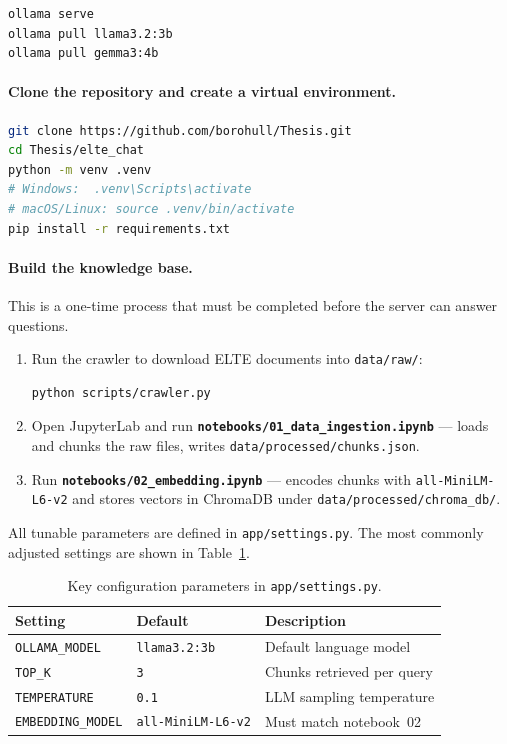 \begin{lstlisting}[language=bash]
ollama serve
ollama pull llama3.2:3b
ollama pull gemma3:4b
\end{lstlisting}

\paragraph{Clone the repository and create a virtual environment.}

\begin{lstlisting}[language=bash]
git clone https://github.com/borohull/Thesis.git
cd Thesis/elte_chat
python -m venv .venv
# Windows:  .venv\Scripts\activate
# macOS/Linux: source .venv/bin/activate
pip install -r requirements.txt
\end{lstlisting}

\paragraph{Build the knowledge base.}
This is a one-time process that must be completed before the server can answer questions.

\begin{enumerate}
    \item Run the crawler to download ELTE documents into \texttt{data/raw/}:
\begin{lstlisting}[language=bash]
python scripts/crawler.py
\end{lstlisting}
    \item Open JupyterLab and run \textbf{\texttt{notebooks/01\_data\_ingestion.ipynb}} — loads and chunks the raw files, writes \texttt{data/processed/chunks.json}.
    \item Run \textbf{\texttt{notebooks/02\_embedding.ipynb}} — encodes chunks with \texttt{all-MiniLM-L6-v2} and stores vectors in ChromaDB under \texttt{data/processed/chroma\_db/}.
\end{enumerate}

All tunable parameters are defined in \texttt{app/settings.py}. The most commonly adjusted settings are shown in Table~\ref{tab:settings}.

\begin{table}[H]
    \centering
    \begin{tabular}{ | m{} | m{} | m{} | }
        \hline
        \textbf{Setting} & \textbf{Default} & \textbf{Description} \\
        \hline \hline
        \texttt{OLLAMA\_MODEL} & \texttt{llama3.2:3b} & Default language model \\
        \hline
        \texttt{TOP\_K} & \texttt{3} & Chunks retrieved per query \\
        \hline
        \texttt{TEMPERATURE} & \texttt{0.1} & LLM sampling temperature \\
        \hline
        \texttt{EMBEDDING\_MODEL} & \texttt{all-MiniLM-L6-v2} & Must match notebook~02 \\
        \hline
    \end{tabular}
    \caption{Key configuration parameters in \texttt{app/settings.py}.}
    \label{tab:settings}
\end{table}

